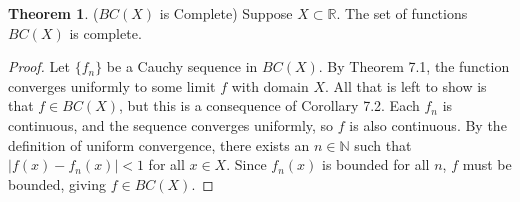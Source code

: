 \documentclass{article}
\newcommand{\N}{\mathbb{N}}
\newcommand{\R}{\mathbb{R}}
\theoremstyle{definition}
\newtheorem{theorem}{Theorem}[section]
\begin{document}
	\begin{theorem}($ BC(X) $ is Complete)
		Suppose $ X\subset \R $. The set of functions $ BC(X) $ is complete. 
	\end{theorem}
	\begin{proof}
		Let $ \{f_n\} $ be a Cauchy sequence in $ BC(X) $. By Theorem 7.1, the function converges uniformly to some limit $ f $ with domain $ X $. All that is left to show is that $ f\in BC(X) $, but this is a consequence of Corollary 7.2. Each $ f_n $ is continuous, and the sequence converges uniformly, so $ f $ is also continuous. By the definition of uniform convergence, there exists an $ n\in\N $ such that $ |f(x)-f_n(x)|<1 $ for all $ x\in X $. Since $ f_n(x) $ is bounded for all $ n $, $ f $ must be bounded, giving $ f\in BC(X) $. 
	\end{proof}
	
\end{document}
